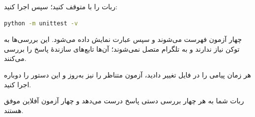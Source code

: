 ربات را با
متوقف کنید؛ سپس اجرا کنید:

\begin{LTR}
\begin{lstlisting}[language=bash,numbers=none]
python -m unittest -v
\end{lstlisting}
\end{LTR}

\begin{resultbox}
چهار آزمون فهرست می‌شوند و سپس عبارت
نمایش داده می‌شود. این بررسی‌ها به توکن نیاز ندارند و به تلگرام متصل نمی‌شوند؛
آن‌ها تابع‌های سازندهٔ پاسخ را بررسی می‌کنند.
\end{resultbox}

هر زمان پیامی را در فایل
تغییر دادید، آزمون متناظر را نیز به‌روز و این دستور را دوباره اجرا کنید.

\begin{checkpointbox}
ربات شما به هر چهار بررسی دستی پاسخ درست می‌دهد و چهار آزمون آفلاین موفق هستند.
\end{checkpointbox}
